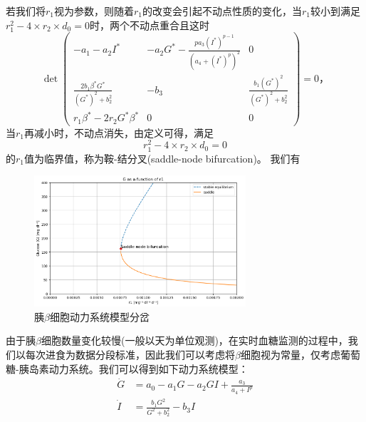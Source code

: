     若我们将$r_1$视为参数，则随着$r_1$的改变会引起不动点性质的变化，当$r_1$较小到满足$r_1^2-4\times r_2\times d_0=0$时，两个不动点重合且这时
    \begin{equation}
        \det \begin{pmatrix}
        -a_1-a_2I^*                            & -a_2G^*-\frac{pa_3(I^*)^{p-1}}{(a_4+(I^*)^p)^2} & 0                                  \\
        \frac{2b_1\beta^*G^*}{(G^*)^2 + b_2^2} & -b_3                                            & \frac{b_1(G^*)^2}{(G^*)^2 + b_2^2} \\
        r_1\beta^*-2r_2G^*\beta^*              & 0                                               & 0
    \end{pmatrix}=0，
    \end{equation}
    当$r_1$再减小时，不动点消失，由定义可得，满足
    \begin{equation}
        r_1^2-4\times r_2\times d_0=0
    \end{equation}
    的$r_1$值为临界值，称为鞍-结分叉(saddle-node bifurcation)。
我们有
\begin{figure}[H]
    \centering
    \includegraphics[width=0.7\textwidth]{Img/betadynamic.png}
    \caption{胰$\beta$细胞动力系统模型分岔}
    \label{fig:bifurcation}
\end{figure}

由于胰$\beta$细胞数量变化较慢(一般以天为单位观测)，在实时血糖监测的过程中，我们以每次进食为数据分段标准，因此我们可以考虑将$\beta$细胞视为常量，仅考虑葡萄糖-胰岛素动力系统\cite{huard2022mathematical}。我们可以得到如下动力系统模型：
\begin{equation}\label{11}
    \begin{aligned}
        \dot{G} & = a_0-a_1G-a_2GI+\frac{a_3}{a_4+I^p}  \\
        \dot{I} & = \frac{b_1 G^2}{G^2 + b_2^2} - b_3 I
    \end{aligned}
\end{equation}

